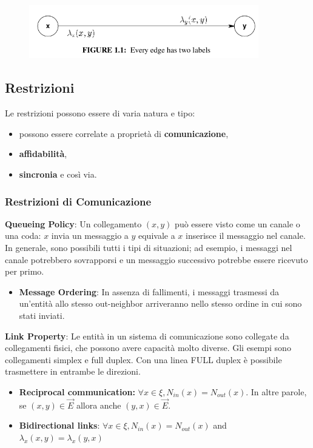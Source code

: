 \begin{figure}[H]
    \centering
    \hspace*{-0.75in}
    \includegraphics[width=10cm, keepaspectratio]{imgs/img1.png}
\end{figure}

\subsection{Restrizioni}
Le restrizioni possono essere di varia natura e tipo:

\begin{itemize}
    \item possono essere correlate a proprietà di \textbf{comunicazione},
    \item \textbf{affidabilità},
    \item \textbf{sincronia} e così via.
\end{itemize}

\subsubsection{Restrizioni di Comunicazione}
\textbf{Queueing Policy}: Un collegamento $(x, y)$ può essere visto come un
canale o una coda: $x$ invia un messaggio a $y$ equivale a $x$ inserisce il
messaggio nel canale. In generale, sono possibili tutti i tipi di situazioni; ad
esempio, i messaggi nel canale potrebbero sovrapporsi e un messaggio successivo
potrebbe essere ricevuto per primo.

\begin{itemize}
    \item \textbf{Message Ordering}: In assenza di fallimenti, i messaggi
          trasmessi da un’entità allo stesso out-neighbor arriveranno nello stesso
          ordine in cui sono stati inviati.
\end{itemize}

\textbf{Link Property}: Le entità in un sistema di comunicazione sono collegate
da collegamenti fisici, che possono avere capacità molto diverse. Gli esempi
sono collegamenti simplex e full duplex. Con una linea FULL duplex è possibile
trasmettere in entrambe le direzioni.

\begin{itemize}
    \item \textbf{Reciprocal communication:} $\forall x \in \xi, N_{in}(x) =
              N_{out}(x)$. In altre parole, se $(x, y) \in \overrightarrow{E}$ allora anche
          $(y, x) \in \overrightarrow{E}$.
    \item \textbf{Bidirectional links}: $\forall x \in \xi, N_{in}(x) =
              N_{out}(x)$ and $\lambda_x (x, y) = \lambda_x (y,x)$
\end{itemize}

